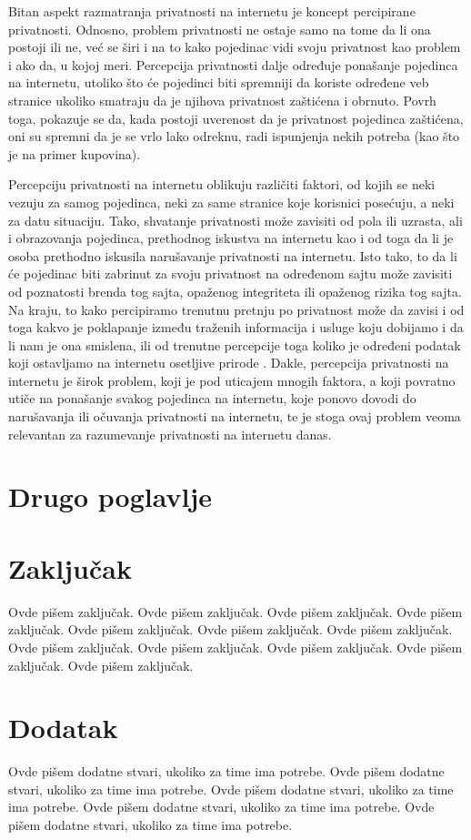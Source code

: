 \documentclass[a4paper]{article}
\begin{document}
Bitan aspekt razmatranja privatnosti na internetu je koncept percipirane privatnosti. Odnosno, problem privatnosti ne ostaje samo na tome da li ona postoji ili ne, već se širi i na to kako pojedinac vidi svoju privatnost kao problem i ako da, u kojoj meri. Percepcija privatnosti dalje određuje ponašanje pojedinca na internetu, utoliko što će pojedinci biti spremniji da koriste određene veb stranice ukoliko smatraju da je njihova privatnost zaštićena i obrnuto. Povrh toga, pokazuje se da, kada postoji uverenost da je privatnost pojedinca zaštićena, oni su spremni da je se vrlo lako odreknu, radi ispunjenja nekih potreba (kao što je na primer kupovina).
\par Percepciju privatnosti na internetu oblikuju različiti faktori, od kojih se neki vezuju za samog pojedinca, neki za same stranice koje korisnici posećuju, a neki za datu situaciju. Tako, shvatanje privatnosti može zavisiti od pola ili uzrasta, ali i obrazovanja pojedinca, prethodnog iskustva na internetu kao i od toga da li je osoba prethodno iskusila narušavanje privatnosti na internetu. Isto tako, to da li će pojedinac biti zabrinut za svoju privatnost na određenom sajtu može zavisiti od poznatosti brenda tog sajta, opaženog integriteta ili opaženog rizika tog sajta. Na kraju, to kako percipiramo trenutnu pretnju po privatnost može da zavisi i od toga kakvo je poklapanje između traženih informacija i usluge koju dobijamo i da li nam je ona smislena, ili od trenutne percepcije toga koliko je određeni podatak koji ostavljamo na internetu osetljive prirode \cite{renata}. Dakle, percepcija privatnosti na internetu je širok problem, koji je pod uticajem mnogih faktora, a koji povratno utiče na ponašanje svakog pojedinca na internetu, koje ponovo dovodi do narušavanja ili očuvanja privatnosti na internetu, te je stoga ovaj problem veoma relevantan za razumevanje privatnosti na internetu danas.
  

\section{Drugo poglavlje}	
\label{sec:drugoPoglavlje}

\section{Zaključak}
\label{sec:zakljucak}

Ovde pišem zaključak. 
Ovde pišem zaključak. 
Ovde pišem zaključak. 
Ovde pišem zaključak. 
Ovde pišem zaključak. 
Ovde pišem zaključak. 
Ovde pišem zaključak. 
Ovde pišem zaključak. 
Ovde pišem zaključak. 
Ovde pišem zaključak. 
Ovde pišem zaključak. 
Ovde pišem zaključak. 


\appendix
 


\appendix
\section{Dodatak}
Ovde pišem dodatne stvari, ukoliko za time ima potrebe.
Ovde pišem dodatne stvari, ukoliko za time ima potrebe.
Ovde pišem dodatne stvari, ukoliko za time ima potrebe.
Ovde pišem dodatne stvari, ukoliko za time ima potrebe.
Ovde pišem dodatne stvari, ukoliko za time ima potrebe.
\end{document}
